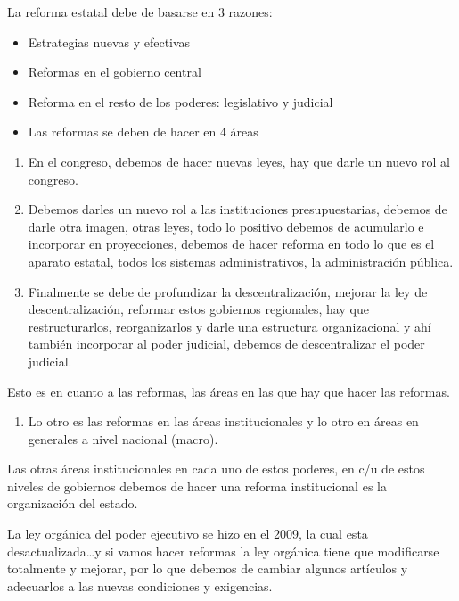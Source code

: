 \documentclass[
  jou,
  floatsintext,
  longtable,
  a4paper,
  nolmodern,
  notxfonts,
  notimes,
  12pt,
  colorlinks=true,linkcolor=blue,citecolor=blue,urlcolor=blue]{apa7}
\providecommand{\tightlist}{%
  \setlength{\itemsep}{0pt}\setlength{\parskip}{0pt}}
\begin{document}
La reforma estatal debe de basarse en 3 razones:

\begin{itemize}
\tightlist
\item
  Estrategias nuevas y efectivas
\item
  Reformas en el gobierno central
\item
  Reforma en el resto de los poderes: legislativo y judicial
\item
  Las reformas se deben de hacer en 4 áreas
\end{itemize}

\begin{enumerate}
\def\labelenumi{\arabic{enumi}.}
\tightlist
\item
  En el congreso, debemos de hacer nuevas leyes, hay que darle un nuevo
  rol al congreso.
\item
  Debemos darles un nuevo rol a las instituciones presupuestarias,
  debemos de darle otra imagen, otras leyes, todo lo positivo debemos de
  acumularlo e incorporar en proyecciones, debemos de hacer reforma en
  todo lo que es el aparato estatal, todos los sistemas administrativos,
  la administración pública.
\item
  Finalmente se debe de profundizar la descentralización, mejorar la ley
  de descentralización, reformar estos gobiernos regionales, hay que
  restructurarlos, reorganizarlos y darle una estructura organizacional
  y ahí también incorporar al poder judicial, debemos de descentralizar
  el poder judicial.
\end{enumerate}

Esto es en cuanto a las reformas, las áreas en las que hay que hacer las
reformas.

\begin{enumerate}
\def\labelenumi{\arabic{enumi}.}
\setcounter{enumi}{3}
\tightlist
\item
  Lo otro es las reformas en las áreas institucionales y lo otro en
  áreas en generales a nivel nacional (macro).
\end{enumerate}

Las otras áreas institucionales en cada uno de estos poderes, en c/u de
estos niveles de gobiernos debemos de hacer una reforma institucional es
la organización del estado.

La ley orgánica del poder ejecutivo se hizo en el 2009, la cual esta
desactualizada\ldots y si vamos hacer reformas la ley orgánica tiene que
modificarse totalmente y mejorar, por lo que debemos de cambiar algunos
artículos y adecuarlos a las nuevas condiciones y exigencias.
\end{document}
